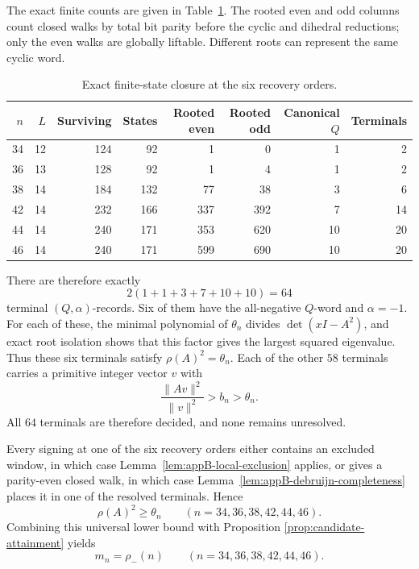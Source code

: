 The exact finite counts are given in Table~\ref{tab:appB-recovery-orders}.
The rooted even and odd columns count closed walks by total bit parity before
the cyclic and dihedral reductions; only the even walks are globally
liftable.  Different roots can represent the same cyclic word.

\begin{table}[t]
\centering
\caption{Exact finite-state closure at the six recovery orders.}
\label{tab:appB-recovery-orders}
\small
\setlength{\tabcolsep}{4pt}
\begin{tabular}{@{}r r r r r r r r@{}}
\toprule
\(n\)&\(L\)&Surviving&States&Rooted even&Rooted odd&Canonical \(Q\)&Terminals\\
\midrule
34&12&124&92 &1  &0  &1 &2\\
36&13&128&92 &1  &4  &1 &2\\
38&14&184&132&77 &38 &3 &6\\
42&14&232&166&337&392&7 &14\\
44&14&240&171&353&620&10&20\\
46&14&240&171&599&690&10&20\\
\bottomrule
\end{tabular}
\end{table}

There are therefore exactly
\begin{equation}\label{eq:appB-terminal-total}
 2(1+1+3+7+10+10)=64
\end{equation}
terminal \((Q,\alpha)\)-records.  Six of them have the all-negative
\(Q\)-word and \(\alpha=-1\).  For each of these, the minimal polynomial of
\(\theta_n\) divides \(\det(xI-A^2)\), and exact root isolation shows that
this factor gives the largest squared eigenvalue.  Thus these six terminals
satisfy \(\rho(A)^2=\theta_n\).  Each of the other \(58\) terminals carries
a primitive integer vector \(v\) with
\[
 \frac{\lVert Av\rVert^2}{\lVert v\rVert^2}>b_n>\theta_n.
\]
All \(64\) terminals are therefore decided, and none remains unresolved.

Every signing at one of the six recovery orders either contains an excluded
window, in which case Lemma~\ref{lem:appB-local-exclusion} applies, or gives
a parity-even closed walk, in which case
Lemma~\ref{lem:appB-debruijn-completeness} places it in one of the resolved
terminals.  Hence
\[
 \rho(A)^2\geq\theta_n
 \qquad(n=34,36,38,42,44,46).
\]
Combining this universal lower bound with Proposition
\ref{prop:candidate-attainment} yields
\begin{equation}\label{eq:appB-recovery-equality}
 m_n=\rho_-(n)
 \qquad(n=34,36,38,42,44,46).
\end{equation}

